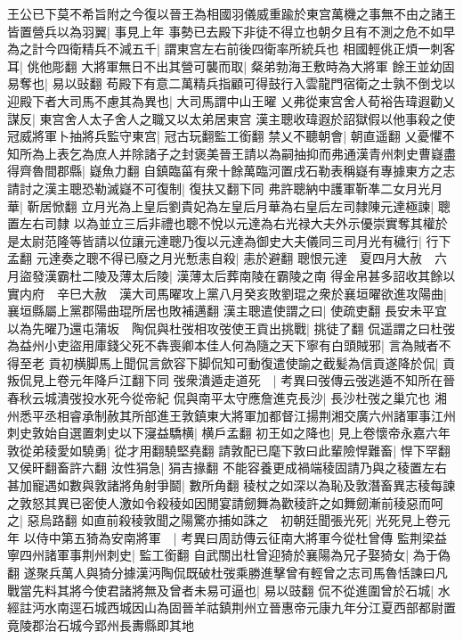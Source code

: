 王公已下莫不希旨附之今復以晉王為相國羽儀威重踰於東宫萬機之事無不由之諸王皆置營兵以為羽翼|{
	事見上年}
事勢已去殿下非徒不得立也朝夕且有不測之危不如早為之計今四衛精兵不減五千|{
	謂東宫左右前後四衛率所統兵也}
相國輕佻正煩一刺客耳|{
	佻他彫翻}
大將軍無日不出其營可襲而取|{
	粲弟勃海王敷時為大將軍}
餘王並幼固易奪也|{
	易以䜴翻}
苟殿下有意二萬精兵指顧可得鼓行入雲龍門宿衛之士孰不倒戈以迎殿下者大司馬不慮其為異也|{
	大司馬謂中山王曜}
乂弗從東宫舍人荀裕告瑋遐勸乂謀反|{
	東宫舍人太子舍人之職又以太弟居東宫}
漢主聰收瑋遐於詔獄假以他事殺之使冠威將軍卜抽將兵監守東宫|{
	冠古玩翻監工銜翻}
禁乂不聽朝會|{
	朝直遥翻}
乂憂懼不知所為上表乞為庶人并除諸子之封褒美晉王請以為嗣抽抑而弗通漢青州刺史曹嶷盡得齊魯間郡縣|{
	嶷魚力翻}
自鎮臨菑有衆十餘萬臨河置戌石勒表稱嶷有專據東方之志請討之漢主聰恐勒滅嶷不可復制|{
	復扶又翻下同}
弗許聰納中護軍靳凖二女月光月華|{
	靳居惞翻}
立月光為上皇后劉貴妃為左皇后月華為右皇后左司隸陳元達極諫|{
	聰置左右司隸}
以為並立三后非禮也聰不悅以元達為右光禄大夫外示優崇實奪其權於是太尉范隆等皆請以位讓元達聰乃復以元達為御史大夫儀同三司月光有穢行|{
	行下孟翻}
元達奏之聰不得已廢之月光慙恚自殺|{
	恚於避翻}
聰恨元達　夏四月大赦　六月盜發漢霸杜二陵及薄太后陵|{
	漢薄太后葬南陵在霸陵之南}
得金帛甚多詔收其餘以實内府　辛巳大赦　漢大司馬曜攻上黨八月癸亥敗劉琨之衆於襄垣曜欲進攻陽曲|{
	襄垣縣屬上黨郡陽曲琨所居也敗補邁翻}
漢主聰遣使謂之曰|{
	使疏吏翻}
長安未平宜以為先曜乃還屯蒲坂　陶侃與杜弢相攻弢使王貢出挑戰|{
	挑徒了翻}
侃遥謂之曰杜弢為益州小吏盜用庫錢父死不犇喪卿本佳人何為隨之天下寧有白頭賊邪|{
	言為賊者不得至老}
貢初横脚馬上聞侃言歛容下脚侃知可動復遣使諭之截髪為信貢遂降於侃|{
	貢叛侃見上卷元年降戶江翻下同}
弢衆潰遁走道死　|{
	考異曰弢傳云弢逃遁不知所在晉春秋云城潰弢投水死今從帝紀}
侃與南平太守應詹進克長沙|{
	長沙杜弢之巢宂也}
湘州悉平丞相睿承制赦其所部進王敦鎮東大將軍加都督江揚荆湘交廣六州諸軍事江州刺史敦始自選置刺史以下寖益驕横|{
	横戶孟翻}
初王如之降也|{
	見上卷懷帝永嘉六年}
敦從弟稜愛如驍勇|{
	從才用翻驍堅堯翻}
請敦配已麾下敦曰此輩險悍難畜|{
	悍下罕翻又侯旰翻畜許六翻}
汝性狷急|{
	狷吉掾翻}
不能容養更成禍端稜固請乃與之稜置左右甚加寵遇如數與敦諸將角射爭鬬|{
	數所角翻}
稜杖之如深以為恥及敦潛畜異志稜每諫之敦怒其異已密使人激如令殺稜如因閒宴請劒舞為歡稜許之如舞劒漸前稜惡而呵之|{
	惡烏路翻}
如直前殺稜敦聞之陽驚亦捕如誅之　初朝廷聞張光死|{
	光死見上卷元年}
以侍中第五猗為安南將軍　|{
	考異曰周訪傳云征南大將軍今從杜曾傳}
監荆梁益寧四州諸軍事荆州刺史|{
	監工銜翻}
自武關出杜曾迎猗於襄陽為兄子娶猗女|{
	為于偽翻}
遂聚兵萬人與猗分據漢沔陶侃既破杜弢乘勝進擊曾有輕曾之志司馬魯恬諫曰凡戰當先料其將今使君諸將無及曾者未易可逼也|{
	易以豉翻}
侃不從進圍曾於石城|{
	水經註沔水南逕石城西城因山為固晉羊祜鎮荆州立晉惠帝元康九年分江夏西部都尉置竟陵郡治石城今郢州長夀縣即其地}
